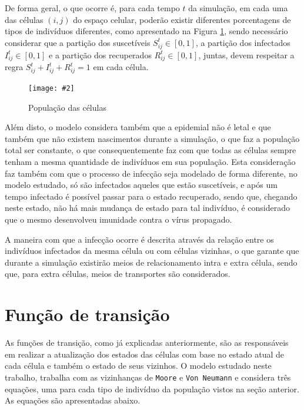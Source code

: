 \documentclass[
	11pt,				%
	openright,			%
	oneside,			%
	a4paper,			%
	english,			%
	french,				%
	spanish,			%
	brazil,				%
	]{abntex2}
\newcommand{\image}[5]{
    \begin{figure}[H]%
        \begin{center}
        \caption{#3}
        \texttt{[image: \#2]}
        \label{#4}
        \fonte{#5}
        \end{center}
    \end{figure}
}
\begin{document}
\par De forma geral, o que ocorre é, para cada tempo $t$ da simulação, em cada uma das células $(i, j)$ do espaço celular, poderão existir diferentes porcentagens de tipos de indivíduos diferentes, como apresentado na Figura \ref{figure:cellArticle}, sendo necessário considerar que a partição dos suscetíveis $S_{ij}^t \in [0, 1]$, a partição dos infectados $I_{ij}^t \in [0, 1]$ e a partição dos recuperados $R_{ij}^t \in [0, 1]$, juntas, devem respeitar a regra $S_{ij}^t + I_{ij}^t + R_{ij}^t = 1$ em cada célula.


\image{0.35}{images/modelo_ca_artigo_v2.png}{População das células}{figure:cellArticle}{Produção dos autores}

\par Além disto, o modelo considera também que a epidemial não é letal e que também que não existem nascimentos durante a simulação, o que faz a população total ser constante, o que consequentemente faz com que todas as células sempre tenham a mesma quantidade de indivíduos em sua população. Esta consideração faz também com que o processo de infecção seja modelado de forma diferente, no modelo estudado, só são infectados aqueles que estão suscetíveis, e após um tempo infectado é possível passar para o estado recuperado, sendo que, chegando neste estado, não há mais mudança de estado para tal indivíduo, é considerado que o mesmo desenvolveu imunidade contra o vírus propagado.

\par A maneira com que a infecção ocorre é descrita através da relação entre os indivíduos infectados da mesma célula ou com células vizinhas, o que garante que durante a simulação existirão meios de relacionamento intra e extra célula, sendo que, para extra células, meios de transportes são considerados.

\section{Função de transição}

\par As funções de transição, como já explicadas anteriormente, são as responsáveis em realizar a atualização dos estados das células com base no estado atual de cada célula e também o estado de seus vizinhos. O modelo estudado neste trabalho, trabalha com as vizinhanças de \texttt{Moore} e \texttt{Von Neumann} e considera três equações, uma para cada tipo de indivíduo da população vistos na seção anterior. As equações são apresentadas abaixo.
\end{document}
